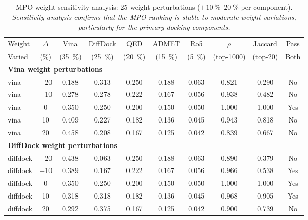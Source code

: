 \documentclass[journal=jcisd8,manuscript=suppinfo]{achemso}
\begin{document}
\begin{table}[htbp]
\centering
\caption{MPO weight sensitivity analysis: \num{25} weight perturbations ($\pm \qtyrange{10}{20}{\percent}$ per component). \textit{Sensitivity analysis confirms that the MPO ranking is stable to moderate weight variations, particularly for the primary docking components.}}
\label{tab:sm_s17_mpo_sensitivity}
\scriptsize
\begin{tabular}{lccccccccc}
\toprule
Weight & $\Delta$ & Vina & DiffDock & QED & ADMET & Ro5 & $\rho$ & Jaccard & Pass \\
Varied & (\unit{\percent}) & (\qty{35}{\percent}) & (\qty{25}{\percent}) & (\qty{20}{\percent}) & (\qty{15}{\percent}) & (\qty{5}{\percent}) & (top-1000) & (top-20) & Both \\
\midrule
\multicolumn{10}{l}{\textbf{Vina weight perturbations}} \\
vina & \num{-20} & \num{0.188} & \num{0.313} & \num{0.250} & \num{0.188} & \num{0.063} & \num{0.821} & \num{0.290} & No \\
vina & \num{-10} & \num{0.278} & \num{0.278} & \num{0.222} & \num{0.167} & \num{0.056} & \num{0.938} & \num{0.482} & No \\
vina & \num{0} & \num{0.350} & \num{0.250} & \num{0.200} & \num{0.150} & \num{0.050} & \num{1.000} & \num{1.000} & Yes \\
vina & \num{+10} & \num{0.409} & \num{0.227} & \num{0.182} & \num{0.136} & \num{0.045} & \num{0.943} & \num{0.818} & No \\
vina & \num{+20} & \num{0.458} & \num{0.208} & \num{0.167} & \num{0.125} & \num{0.042} & \num{0.839} & \num{0.667} & No \\
\midrule
\multicolumn{10}{l}{\textbf{DiffDock weight perturbations}} \\
diffdock & \num{-20} & \num{0.438} & \num{0.063} & \num{0.250} & \num{0.188} & \num{0.063} & \num{0.890} & \num{0.379} & No \\
diffdock & \num{-10} & \num{0.389} & \num{0.167} & \num{0.222} & \num{0.167} & \num{0.056} & \num{0.966} & \num{0.538} & Yes \\
diffdock & \num{0} & \num{0.350} & \num{0.250} & \num{0.200} & \num{0.150} & \num{0.050} & \num{1.000} & \num{1.000} & Yes \\
diffdock & \num{+10} & \num{0.318} & \num{0.318} & \num{0.182} & \num{0.136} & \num{0.045} & \num{0.968} & \num{0.905} & Yes \\
diffdock & \num{+20} & \num{0.292} & \num{0.375} & \num{0.167} & \num{0.125} & \num{0.042} & \num{0.900} & \num{0.739} & No \\

\end{tabular}
\end{table}
\end{document}
